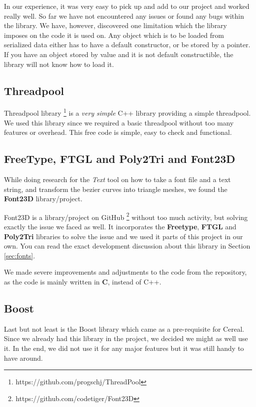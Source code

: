 In our experience, it was very easy to pick up and add to our project and worked really well. So far we have not encountered any issues or found any bugs within the library. We have, however, discovered one limitation which the library imposes on the code it is used on. Any object which is to be loaded from serialized data either has to have a default constructor, or be stored by a pointer. If you have an object stored by value and it is not default constructible, the library will not know how to load it.

\subsection{Threadpool}

Threadpool library \footnote{https://github.com/progschj/ThreadPool} is a \emph{very simple} C++ library providing a simple threadpool. We used this library since we required a basic threadpool without too many features or overhead. This free code is simple, easy to check and functional.

\subsection{FreeType, FTGL and Poly2Tri and Font23D}

While doing research for the \textit{Text} tool on how to take a font file and a text string, and transform the bezier curves into triangle meshes, we found the \textbf{Font23D} library/project.

Font23D is a library/project on GitHub \footnote{https://github.com/codetiger/Font23D} without too much activity, but solving exactly the issue we faced as well. It incorporates the \textbf{Freetype}, \textbf{FTGL} and \textbf{Poly2Tri} libraries to solve the issue and we used it parts of this project in our own. You can read the exact development discussion about this library in Section \ref{sec:fonts}.

We made severe improvements and adjustments to the code from the repository, as the code is mainly written in \textbf{C}, instead of C++.

\subsection{Boost}

Last but not least is the Boost library which came as a pre-requisite for Cereal. Since we already had this library in the project, we decided we might as well use it. In the end, we did not use it for any major features but it was still handy to have around.

